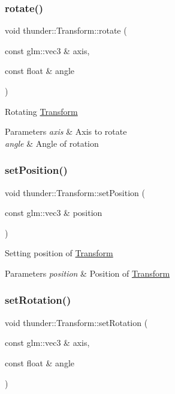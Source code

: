 \subsubsection{\texorpdfstring{rotate()}{rotate()}}
{\footnotesize\ttfamily void thunder\+::\+Transform\+::rotate (\begin{DoxyParamCaption}\item[{const glm\+::vec3 \&}]{axis,  }\item[{const float \&}]{angle }\end{DoxyParamCaption})}

Rotating \mbox{\hyperlink{classthunder_1_1_transform}{Transform}}


\begin{DoxyParams}{Parameters}
{\em axis} & Axis to rotate \\
\hline
{\em angle} & Angle of rotation \\
\hline
\end{DoxyParams}
\mbox{\label{classthunder_1_1_transform_a7ce46713d4f7b0f503b406634a9bd437}} 
\subsubsection{\texorpdfstring{set\+Position()}{setPosition()}}
{\footnotesize\ttfamily void thunder\+::\+Transform\+::set\+Position (\begin{DoxyParamCaption}\item[{const glm\+::vec3 \&}]{position }\end{DoxyParamCaption})}

Setting position of \mbox{\hyperlink{classthunder_1_1_transform}{Transform}}


\begin{DoxyParams}{Parameters}
{\em position} & Position of \mbox{\hyperlink{classthunder_1_1_transform}{Transform}} \\
\hline
\end{DoxyParams}
\mbox{\label{classthunder_1_1_transform_a8ccebf81e7a314ffe11cf461e56a9f22}} 
\subsubsection{\texorpdfstring{set\+Rotation()}{setRotation()}}
{\footnotesize\ttfamily void thunder\+::\+Transform\+::set\+Rotation (\begin{DoxyParamCaption}\item[{const glm\+::vec3 \&}]{axis,  }\item[{const float \&}]{angle }\end{DoxyParamCaption})}

